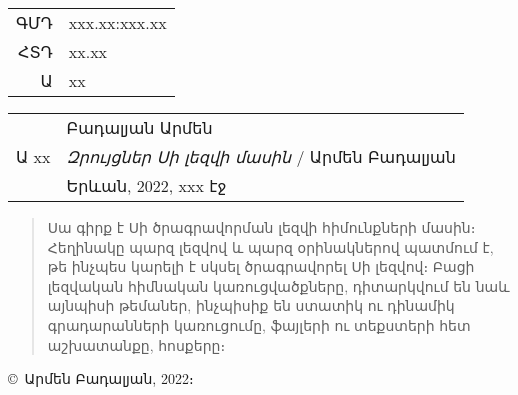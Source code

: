 \begin{titlepage}

\begingroup
\small\sffamily\linespread{1}
\begin{tabular}{rl}
ԳՄԴ & xxx.xx:xxx.xx \\
ՀՏԴ & xx.xx \\
Ա & xx \\
\end{tabular}
\endgroup

\vskip2cm

\begin{tabular}{rl}
     & Բադալյան Արմեն \\
Ա xx & \textsl{Զրույցներ Սի լեզվի մասին} / Արմեն Բադալյան \\
     & Երևան, 2022, xxx էջ
\end{tabular}

\begin{quote}\small
Սա գիրք է Սի ծրագրավորման լեզվի հիմունքների մասին։ Հեղինակը պարզ լեզվով
և պարզ օրինակներով պատմում է, թե ինչպես կարելի է սկսել ծրագրավորել Սի
լեզվով։ Բացի լեզվական հիմնական կառուցվածքները, դիտարկվում են նաև այնպիսի
թեմաներ, ինչպիսիք են ստատիկ ու դինամիկ գրադարանների կառուցումը, ֆայլերի
ու տեքստերի հետ աշխատանքը, հոսքերը։
\end{quote}

\vfill
\textsf{\copyright\ Արմեն Բադալյան, 2022։}

\end{titlepage}
